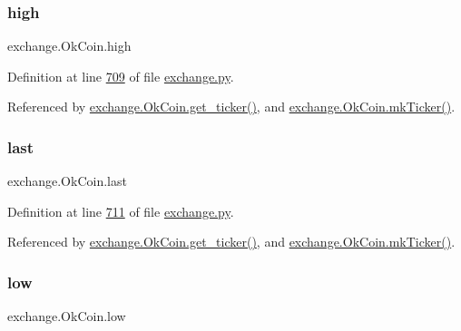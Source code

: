 \mbox{\label{classexchange_1_1_ok_coin_af9d9dbcfc86404510e7f9a5704e8eecd}} 
\subsubsection{\texorpdfstring{high}{high}}
{\footnotesize\ttfamily exchange.\+Ok\+Coin.\+high}



Definition at line \hyperlink{exchange_8py_source_l00709}{709} of file \hyperlink{exchange_8py_source}{exchange.\+py}.



Referenced by \hyperlink{exchange_8py_source_l00716}{exchange.\+Ok\+Coin.\+get\+\_\+ticker()}, and \hyperlink{exchange_8py_source_l00730}{exchange.\+Ok\+Coin.\+mk\+Ticker()}.

\mbox{\label{classexchange_1_1_ok_coin_a726afbe3a75835fdcbe523aed8d6763c}} 
\subsubsection{\texorpdfstring{last}{last}}
{\footnotesize\ttfamily exchange.\+Ok\+Coin.\+last}



Definition at line \hyperlink{exchange_8py_source_l00711}{711} of file \hyperlink{exchange_8py_source}{exchange.\+py}.



Referenced by \hyperlink{exchange_8py_source_l00716}{exchange.\+Ok\+Coin.\+get\+\_\+ticker()}, and \hyperlink{exchange_8py_source_l00730}{exchange.\+Ok\+Coin.\+mk\+Ticker()}.

\mbox{\label{classexchange_1_1_ok_coin_a1afa53e0ad63830d0585288abea42094}} 
\subsubsection{\texorpdfstring{low}{low}}
{\footnotesize\ttfamily exchange.\+Ok\+Coin.\+low}




